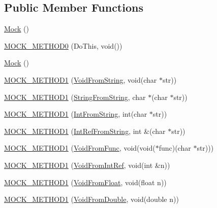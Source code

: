 \subsection*{Public Member Functions}
\begin{DoxyCompactItemize}
\item 
\mbox{\hyperlink{class_mock_a2b9528f2e7fcf9738201a5ea667c1998}{Mock}} ()
\item 
\mbox{\hyperlink{class_mock_ae710f23cafb1a2f17772e8805d6312d2}{M\+O\+C\+K\+\_\+\+M\+E\+T\+H\+O\+D0}} (Do\+This, void())
\item 
\mbox{\hyperlink{class_mock_a2b9528f2e7fcf9738201a5ea667c1998}{Mock}} ()
\item 
\mbox{\hyperlink{class_mock_ada59eea6991953353f332e3ea1e74444}{M\+O\+C\+K\+\_\+\+M\+E\+T\+H\+O\+D1}} (\mbox{\hyperlink{class_interface_a65d6ae604e7e9a513aec72c9c94e0b97}{Void\+From\+String}}, void(char $\ast$str))
\item 
\mbox{\hyperlink{class_mock_a2db4d82b6f92b4e462929f651ac4c3b1}{M\+O\+C\+K\+\_\+\+M\+E\+T\+H\+O\+D1}} (\mbox{\hyperlink{class_interface_a756b1d22c12aa3f14a5083f90043fbf0}{String\+From\+String}}, char $\ast$(char $\ast$str))
\item 
\mbox{\hyperlink{class_mock_ae73b4ee90bf6d84205d2b1c17f0b8433}{M\+O\+C\+K\+\_\+\+M\+E\+T\+H\+O\+D1}} (\mbox{\hyperlink{class_interface_ab34c8a5fd2236a6b009f86a4e5851b61}{Int\+From\+String}}, int(char $\ast$str))
\item 
\mbox{\hyperlink{class_mock_a2cece30a3ea92b34f612f8032fe3a0f9}{M\+O\+C\+K\+\_\+\+M\+E\+T\+H\+O\+D1}} (\mbox{\hyperlink{class_interface_ab93276de67e60c44fd775d4c139aa8e1}{Int\+Ref\+From\+String}}, int \&(char $\ast$str))
\item 
\mbox{\hyperlink{class_mock_ac70c052254fa9816bd759c006062dc47}{M\+O\+C\+K\+\_\+\+M\+E\+T\+H\+O\+D1}} (\mbox{\hyperlink{class_interface_a7dab3c82b857a9a5f52b3ce6f7df547f}{Void\+From\+Func}}, void(void($\ast$func)(char $\ast$str)))
\item 
\mbox{\hyperlink{class_mock_ae2379efbc030f1adf8b032be3bdf081d}{M\+O\+C\+K\+\_\+\+M\+E\+T\+H\+O\+D1}} (\mbox{\hyperlink{class_interface_aa43fb56650a57b6b3e7743e54e50cb86}{Void\+From\+Int\+Ref}}, void(int \&n))
\item 
\mbox{\hyperlink{class_mock_a3fd62026610c5d3d3aeaaf2ade3e18aa}{M\+O\+C\+K\+\_\+\+M\+E\+T\+H\+O\+D1}} (\mbox{\hyperlink{class_interface_ae2b3e9411c893a45642d3af632752c66}{Void\+From\+Float}}, void(float n))
\item 
\mbox{\hyperlink{class_mock_a890668928abcd28d4d39df164e7b6dd8}{M\+O\+C\+K\+\_\+\+M\+E\+T\+H\+O\+D1}} (\mbox{\hyperlink{class_interface_aa56524017aabdbe46510648c711ab8a8}{Void\+From\+Double}}, void(double n))

\end{DoxyCompactItemize}
